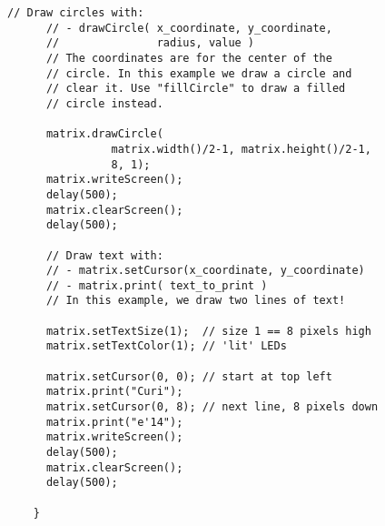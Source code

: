 \begin{minipage}[t]{0.49\tw}
\begin{Verbatim}[gobble=3,fontsize=\small]
      // Draw circles with:
      // - drawCircle( x_coordinate, y_coordinate,
      //               radius, value )
      // The coordinates are for the center of the
      // circle. In this example we draw a circle and
      // clear it. Use "fillCircle" to draw a filled
      // circle instead.

      matrix.drawCircle(
                matrix.width()/2-1, matrix.height()/2-1,
                8, 1);
      matrix.writeScreen();
      delay(500);
      matrix.clearScreen();
      delay(500);

      // Draw text with:
      // - matrix.setCursor(x_coordinate, y_coordinate)
      // - matrix.print( text_to_print )
      // In this example, we draw two lines of text!

      matrix.setTextSize(1);  // size 1 == 8 pixels high
      matrix.setTextColor(1); // 'lit' LEDs

      matrix.setCursor(0, 0); // start at top left
      matrix.print("Curi");
      matrix.setCursor(0, 8); // next line, 8 pixels down
      matrix.print("e'14");
      matrix.writeScreen();
      delay(500);
      matrix.clearScreen();
      delay(500);

    }
  \end{Verbatim}
\end{minipage}
\vspace{0.1in}

